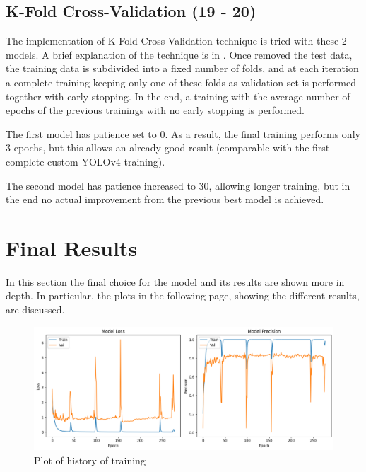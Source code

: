 \documentclass[a4paper,12pt]{article}
\begin{document}
\subsection{K-Fold Cross-Validation (19 - 20)}
The implementation of K-Fold Cross-Validation technique is tried with these 2 models. A brief explanation of the technique is in \cite{kfold}. Once removed the test data, the training data is subdivided into a fixed number of folds, and at each iteration a complete training keeping only one of these folds as validation set is performed together with early stopping. In the end, a training with the average number of epochs of the previous trainings with no early stopping is performed.

The first model has patience set to 0. As a result, the final training performs only 3 epochs, but this allows an already good result (comparable with the first complete custom YOLOv4 training).

The second model has patience increased to 30, allowing longer training, but in the end no actual improvement from the previous best model is achieved.





\section{Final Results}
In this section the final choice for the model and its results are shown more in depth. In particular, the plots in the following page, showing the different results, are discussed.


\begin{figure}[H]
	\centering
	\includegraphics[width=0.8\linewidth]{final_results_training.png}
	\caption{Plot of history of training}
	\label{fig:best_training_plot}
\end{figure}
\end{document}
